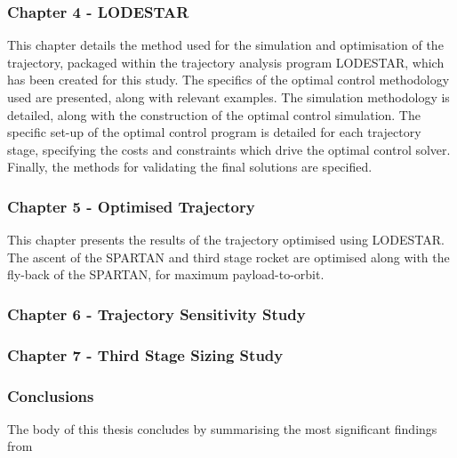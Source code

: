       
      \subsubsection*{Chapter 4 - LODESTAR}
      
      This chapter details the method used for the simulation and optimisation of the trajectory, packaged within the trajectory analysis program LODESTAR, which has been created for this study. The specifics of the optimal control methodology used are presented, along with relevant examples. The simulation methodology is detailed, along with the construction of the optimal control simulation. The specific set-up of the optimal control program is detailed for each trajectory stage, specifying the costs and constraints which drive the optimal control solver. Finally, the methods for validating the final solutions are specified.
      
      \subsubsection*{Chapter 5 - Optimised Trajectory}
      
      This chapter presents the results of the trajectory optimised using LODESTAR. The ascent of the SPARTAN and third stage rocket are optimised along with the fly-back of the SPARTAN, for maximum payload-to-orbit. 
      
      \subsubsection*{Chapter 6 - Trajectory Sensitivity Study}
      
      \subsubsection*{Chapter 7 - Third Stage Sizing Study}

    \subsubsection*{Conclusions}

      The body of this thesis concludes by summarising the most significant findings from
